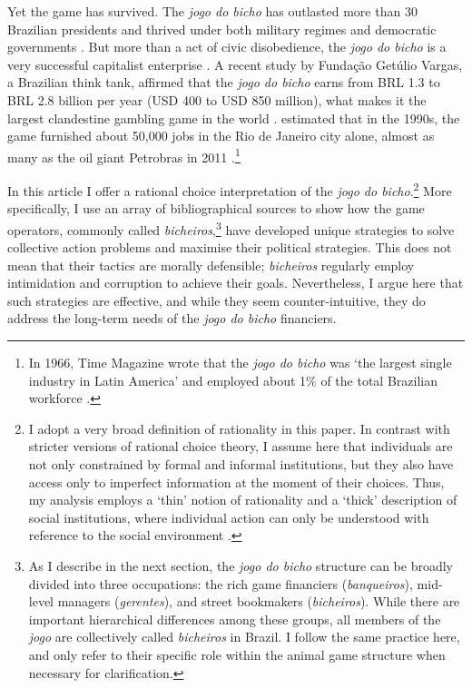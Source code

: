 \documentclass[a4paper,12pt]{article}
\begin{document}
Yet the game has survived. The \textit{jogo do bicho} has outlasted more than 30 Brazilian presidents and thrived under both military regimes and democratic governments \citep{jupiara2015poroes}. But more than a act of civic disobedience, the \textit{jogo do bicho} is a very successful capitalist enterprise \citep{labronici2014sorteio, magalhaes2005ganhou}. A recent study by Fundação Getúlio Vargas, a Brazilian think tank, affirmed that the \textit{jogo do bicho} earns from BRL 1.3 to BRL 2.8 billion per year (USD 400 to USD 850 million), what makes it the largest clandestine gambling game in the world \citep{huff2015jogos}. \citet[171]{schneider1996brazil} estimated that in the 1990s, the game furnished about 50,000 jobs in the Rio de Janeiro city alone, almost as many as the oil giant Petrobras in 2011 \citep{exame2016petrobras}.\footnote{In 1966, Time Magazine wrote that the \textit{jogo do bicho} was `the largest single industry in Latin America' and employed about 1\% of the total Brazilian workforce \citep{time1966bicho}.}

In this article I offer a rational choice interpretation of the \textit{jogo do bicho}.\footnote{I adopt a very broad definition of rationality in this paper. In contrast with stricter versions of rational choice theory, I assume here that individuals are not only constrained by formal and informal institutions, but they also have access only to imperfect information at the moment of their choices. Thus, my analysis employs a `thin' notion of rationality and a `thick' description of social institutions, where individual action can only be understood with reference to the social environment \citep[253]{boettke2001calculation}.} More specifically, I use an array of bibliographical sources to show how the game operators, commonly called \textit{bicheiros},\footnote{As I describe in the next section, the \textit{jogo do bicho} structure can be broadly divided into three occupations: the rich game financiers (\textit{banqueiros}), mid-level managers (\textit{gerentes}), and street bookmakers (\textit{bicheiros}). While there are important hierarchical differences among these groups, all members of the \textit{jogo} are collectively called \textit{bicheiros} in Brazil. I follow the same practice here, and only refer to their specific role within the animal game structure when necessary for clarification.} have developed unique strategies to solve collective action problems and maximise their political strategies. This does not mean that their tactics are morally defensible; \textit{bicheiros} regularly employ intimidation and corruption to achieve their goals. Nevertheless, I argue here that such strategies are effective, and while they seem counter-intuitive, they do address the long-term needs of the \textit{jogo do bicho} financiers. 
\end{document}
